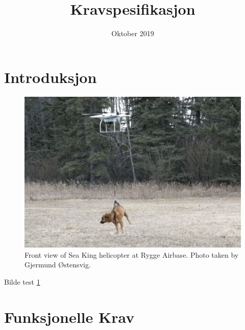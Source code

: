 \documentclass{article}
\title{Kravspesifikasjon}
\author{}
\date{Oktober 2019}
\begin{document}
\maketitle

\section{Introduksjon}
\begin{figure}[h]
\centering 
    \includegraphics[scale=0.1]{images/dog}
    \caption{Front view of Sea King helicopter at Rygge Airbase. Photo taken by Gjermund Østensvig.}\label{fig:Seaking1}
\end{figure}

Bilde test \ref{fig:Seaking1}

\section{Funksjonelle Krav}
\end{document}
